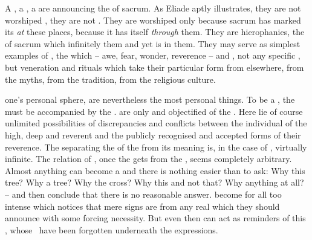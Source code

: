 A , a , a  are 
announcing the  of sacrum. As Eliade aptly illustrates, they are
not worshiped , they are not . They
are worshiped only because sacrum has marked its  {\em at} these
places, because it has  itself {\em through} them. They are
hierophanies, the  of sacrum which infinitely  them and
yet is  in them.  They may serve as simplest examples of
, the  which  -- awe,
fear, wonder, reverence -- and , not any specific , but
veneration and rituals which take their particular form from elsewhere, from
the myths, from the tradition, from the religious culture. 

{}

\pa {} {one's} personal sphere,  are nevertheless the
most personal things. To be a , the  must be
accompanied by the .  are only
 and {objectified}  of the \oss.  Here lie of
course unlimited possibilities of discrepancies and conflicts between the
individual  of the high, deep and reverent and the publicly
recognised  and accepted forms of their reverence.  The
 separating the  of the  from its meaning
is, in the case of , virtually infinite.  The relation of
, once the  gets  from the \oss,
seems completely arbitrary. Almost anything can become a  and there
is nothing easier than to ask: Why this tree? Why a tree?  Why the cross? Why
this and not that? Why anything at all? -- and then conclude that there is no
reasonable answer.  become  for all too intense
 which notices that mere signs are  from
any real  which they should announce 
with some forcing necessity. But even then  can act as
reminders of this , whose \oss\ have been forgotten underneath the
 expressions.

